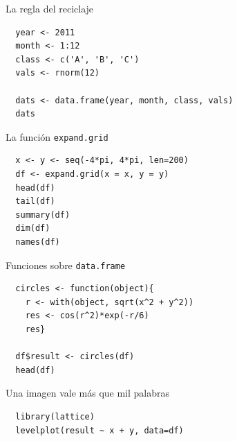 \documentclass[xcolor={usenames,svgnames,dvipsnames}]{beamer}
\begin{document}
\begin{frame}[fragile,label=sec-4-2-3]{La regla del reciclaje}
 \lstset{language=R,label= ,caption= ,numbers=none}
\begin{lstlisting}
  year <- 2011
  month <- 1:12
  class <- c('A', 'B', 'C')
  vals <- rnorm(12)
  
  dats <- data.frame(year, month, class, vals)
  dats
\end{lstlisting}
\end{frame}
\begin{frame}[fragile,label=sec-4-2-4]{La función \texttt{expand.grid}}
 \lstset{language=R,label= ,caption= ,numbers=none}
\begin{lstlisting}
  x <- y <- seq(-4*pi, 4*pi, len=200)
  df <- expand.grid(x = x, y = y)
  head(df)
  tail(df)
  summary(df)
  dim(df)
  names(df)
\end{lstlisting}
\end{frame}

\begin{frame}[fragile,label=sec-4-2-5]{Funciones sobre \texttt{data.frame}}
 \lstset{language=R,label= ,caption= ,numbers=none}
\begin{lstlisting}
  circles <- function(object){
    r <- with(object, sqrt(x^2 + y^2))
    res <- cos(r^2)*exp(-r/6)
    res}
  
  df$result <- circles(df)
  head(df)
\end{lstlisting}
\end{frame}

\begin{frame}[fragile,label=sec-4-2-6]{Una imagen vale más que mil palabras}
 \lstset{language=R,label= ,caption= ,numbers=none}
\begin{lstlisting}
  library(lattice)
  levelplot(result ~ x + y, data=df)
\end{lstlisting}
\end{frame}
\end{document}

